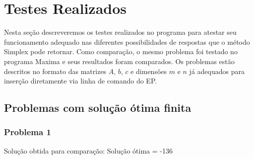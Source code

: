\documentclass[brazil,times]{abnt}
\begin{document}
\section*{Testes Realizados}
Nesta seção descreveremos os testes realizados no programa para atestar seu funcionamento adequado nas diferentes possibilidades de respostas que o método Simplex pode retornar. Como comparação, o mesmo problema foi testado no programa Maxima \cite{maxima} e seus resultados foram comparados. Os problemas estão descritos no formato das matrizes $A$, $b$, $c$ e dimensões $m$ e $n$ já adequados para inserção diretamente via linha de comando do EP.

\subsection*{Problemas com solução ótima finita}
\subsubsection*{Problema 1}
Solução obtida para comparação: Solução ótima = -136
\end{document}
